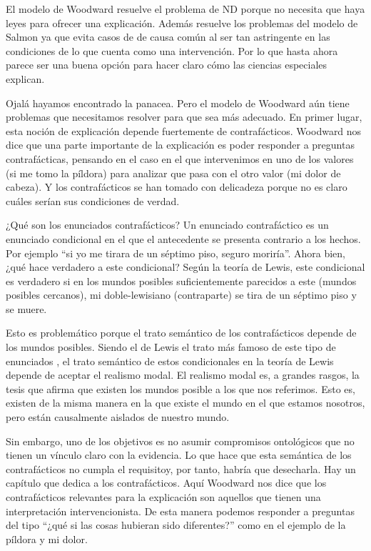 El modelo de Woodward resuelve el problema de ND porque no necesita que haya leyes para ofrecer una explicación. Además resuelve los problemas del modelo de Salmon ya que evita casos de de causa común al ser tan astringente en las condiciones de lo que cuenta como una intervención. Por lo que hasta ahora parece ser una buena opción para hacer claro cómo las ciencias especiales explican.

Ojalá hayamos encontrado la panacea. Pero el modelo de Woodward aún tiene problemas que necesitamos resolver para que sea más adecuado. En primer lugar, esta noción de explicación depende fuertemente de contrafácticos. Woodward nos dice que una parte importante de la explicación es poder responder a preguntas contrafácticas, pensando en el caso en el que intervenimos en uno de los valores (si me tomo la píldora) para analizar que pasa con el otro valor (mi dolor de cabeza). Y los contrafácticos se han tomado con delicadeza porque no es claro cuáles serían sus condiciones de verdad.

¿Qué son los enunciados contrafácticos? Un enunciado contrafáctico es un enunciado condicional en el que el antecedente se presenta contrario a los hechos. Por ejemplo ``si yo me tirara de un séptimo piso, seguro moriría''. Ahora bien, ¿qué hace verdadero a este condicional? Según la teoría de Lewis, este condicional es verdadero si en los mundos posibles suficientemente parecidos a este (mundos posibles cercanos), mi doble-lewisiano (contraparte) se tira de un séptimo piso y se muere.

Esto es problemático porque el trato semántico de los contrafácticos depende de los mundos posibles. Siendo el de Lewis el trato más famoso de este tipo de enunciados \citeyear{Lewis1973}, el trato semántico de estos condicionales en la teoría de Lewis depende de aceptar el realismo modal. El realismo modal es, a grandes rasgos, la tesis que afirma que existen los mundos posible a los que nos referimos. Esto es, existen de la misma manera en la que existe el mundo en el que estamos nosotros, pero están causalmente aislados de nuestro mundo.

Sin embargo, uno de los objetivos es no asumir compromisos ontológicos que no tienen un vínculo claro con la evidencia. Lo que hace que esta semántica de los contrafácticos no cumpla el requisitoy, por tanto, habría que desecharla. Hay un capítulo que \cite[cap. 5]{Woodward2003} dedica a los contrafácticos. Aquí Woodward nos dice que los contrafácticos relevantes para la explicación son aquellos que tienen una interpretación intervencionista. De esta manera podemos responder a preguntas del tipo ``¿qué si las cosas hubieran sido diferentes?'' como en el ejemplo de la píldora y mi dolor.

